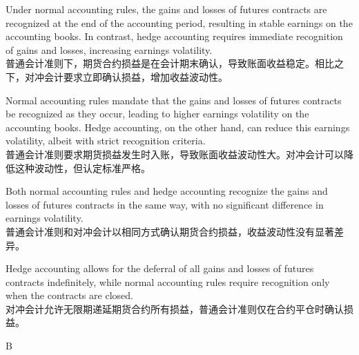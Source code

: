 \documentclass{article}
\begin{document}
    \begin{choices}
        \item Under normal accounting rules, the gains and losses of futures contracts are recognized at the end of the accounting period, resulting in stable earnings on the accounting books. In contrast, hedge accounting requires immediate recognition of gains and losses, increasing earnings volatility.\\
        普通会计准则下，期货合约损益是在会计期末确认，导致账面收益稳定。相比之下，对冲会计要求立即确认损益，增加收益波动性。
        \item Normal accounting rules mandate that the gains and losses of futures contracts be recognized as they occur, leading to higher earnings volatility on the accounting books. Hedge accounting, on the other hand, can reduce this earnings volatility, albeit with strict recognition criteria.\\
        普通会计准则要求期货损益发生时入账，导致账面收益波动性大。对冲会计可以降低这种波动性，但认定标准严格。
        \item Both normal accounting rules and hedge accounting recognize the gains and losses of futures contracts in the same way, with no significant difference in earnings volatility.\\
        普通会计准则和对冲会计以相同方式确认期货合约损益，收益波动性没有显著差异。
        \item Hedge accounting allows for the deferral of all gains and losses of futures contracts indefinitely, while normal accounting rules require recognition only when the contracts are closed.\\
        对冲会计允许无限期递延期货合约所有损益，普通会计准则仅在合约平仓时确认损益。
    \end{choices}
    
    \begin{correctanswer}
    B
    \end{correctanswer}
    
\end{document}
